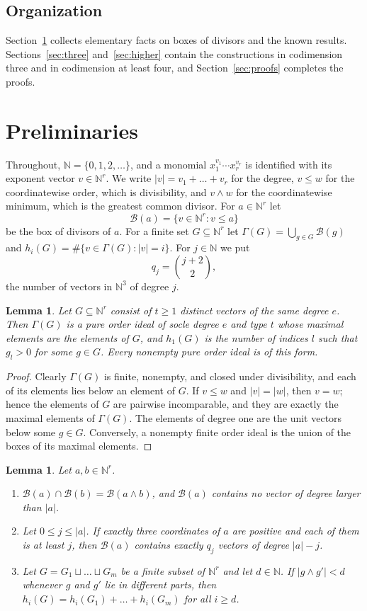 \documentclass{amsart}
\newtheorem{lemma}[theorem]{Lemma}
\theoremstyle{definition}
\theoremstyle{remark}
\newcommand{\N}{\mathbb{N}}
\newcommand{\B}{\mathcal{B}}
\begin{document}
\subsection*{Organization}
Section~\ref{sec:prelim} collects elementary facts on boxes of divisors and the known results. Sections~\ref{sec:three} and~\ref{sec:higher} contain the constructions in codimension three and in codimension at least four, and Section~\ref{sec:proofs} completes the proofs.

\section{Preliminaries}\label{sec:prelim}

Throughout, $\N=\{0,1,2,\dots\}$, and a monomial $x_1^{v_1}\cdots x_r^{v_r}$ is identified with its exponent vector $v\in\N^r$. We write $|v|=v_1+\dots+v_r$ for the degree, $v\le w$ for the coordinatewise order, which is divisibility, and $v\wedge w$ for the coordinatewise minimum, which is the greatest common divisor. For $a\in\N^r$ let
\[
\B(a)=\{v\in\N^r: v\le a\}
\]
be the box of divisors of $a$. For a finite set $G\subseteq\N^r$ let $\Gamma(G)=\bigcup_{g\in G}\B(g)$ and $h_i(G)=\#\{v\in\Gamma(G):|v|=i\}$. For $j\in\N$ we put
\[
q_j=\binom{j+2}{2},
\]
the number of vectors in $\N^3$ of degree $j$.

\begin{lemma}\label{lem:pure}
Let $G\subseteq\N^r$ consist of $t\ge 1$ distinct vectors of the same degree $e$. Then $\Gamma(G)$ is a pure order ideal of socle degree $e$ and type $t$ whose maximal elements are the elements of $G$, and $h_1(G)$ is the number of indices $l$ such that $g_l>0$ for some $g\in G$. Every nonempty pure order ideal is of this form.
\end{lemma}

\begin{proof}
Clearly $\Gamma(G)$ is finite, nonempty, and closed under divisibility, and each of its elements lies below an element of $G$. If $v\le w$ and $|v|=|w|$, then $v=w$; hence the elements of $G$ are pairwise incomparable, and they are exactly the maximal elements of $\Gamma(G)$. The elements of degree one are the unit vectors below some $g\in G$. Conversely, a nonempty finite order ideal is the union of the boxes of its maximal elements.
\end{proof}

\begin{lemma}\label{lem:boxes}
Let $a,b\in\N^r$.
\begin{enumerate}
\item[(a)] $\B(a)\cap\B(b)=\B(a\wedge b)$, and $\B(a)$ contains no vector of degree larger than $|a|$.
\item[(b)] Let $0\le j\le|a|$. If exactly three coordinates of $a$ are positive and each of them is at least $j$, then $\B(a)$ contains exactly $q_j$ vectors of degree $|a|-j$.
\item[(c)] Let $G=G_1\sqcup\dots\sqcup G_m$ be a finite subset of $\N^r$ and let $d\in\N$. If $|g\wedge g'|<d$ whenever $g$ and $g'$ lie in different parts, then $h_i(G)=h_i(G_1)+\dots+h_i(G_m)$ for all $i\ge d$.
\end{enumerate}
\end{lemma}
\end{document}

